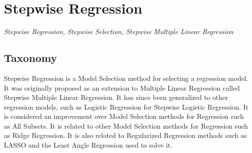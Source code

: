 
\section{Stepwise Regression} 
\label{sec:stepwise}

\emph{Stepwise Regression, Stepwise Selection, Stepwise Multiple Linear Regression}

\subsection{Taxonomy}
Stepwise Regression is a Model Selection method for selecting a regression model. It was originally proposed as an extension to Multiple Linear Regression called Stepwise Multiple Linear Regression. It has since been generalized to other regression models, such as Logistic Regression for Stepwise Logistic Regression.
It is considered an improvement over Model Selection methods for Regression such as All Subsets.
It is related to other Model Selection methods for Regression such as Ridge Regression. It is also related to Regularized Regression methods such as LASSO and the Least Angle Regression used to solve it.

